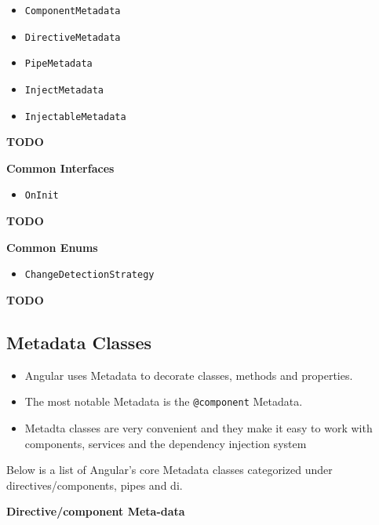 \documentclass[12pt,]{article}
\providecommand{\tightlist}{%
  \setlength{\itemsep}{0pt}\setlength{\parskip}{0pt}}
\begin{document}
\begin{itemize}
\tightlist
\item
  \texttt{ComponentMetadata}
\item
  \texttt{DirectiveMetadata}
\item
  \texttt{PipeMetadata}
\item
  \texttt{InjectMetadata}
\item
  \texttt{InjectableMetadata}
\end{itemize}

\textbf{TODO}

\textbf{Common Interfaces}

\begin{itemize}
\tightlist
\item
  \texttt{OnInit}
\end{itemize}

\textbf{TODO}

\textbf{Common Enums}

\begin{itemize}
\tightlist
\item
  \texttt{ChangeDetectionStrategy}
\end{itemize}

\textbf{TODO}

\subsection{Metadata Classes}\label{metadata-classes}

\begin{itemize}
\tightlist
\item
  Angular uses Metadata to decorate classes, methods and properties.
\item
  The most notable Metadata is the \texttt{@component} Metadata.
\item
  Metadta classes are very convenient and they make it easy to work with
  components, services and the dependency injection system
\end{itemize}

Below is a list of Angular's core Metadata classes categorized under
directives/components, pipes and di.

\textbf{Directive/component Meta-data}
\end{document}
